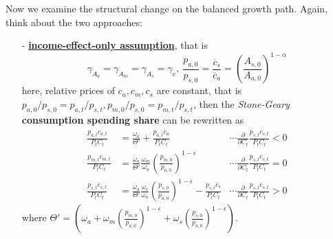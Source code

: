 \documentclass[10pt,landscape,a4paper]{article}
\let\bar\overline
\begin{document}
\begin{multicols*}{3}
\vspace{2pt}

\vspace{2pt}
Now we examine the structural change on the balanced growth path. Again, think about the two approaches:
\begin{itemize}
    \item[-] \underline{\textbf{income-effect-only assumption}}, that is $$\gamma_{A_a}=\gamma_{A_m}=\gamma_{A_s}=\gamma_c,\ \frac{p_{a,0}}{p_{s,0}}=\frac{\bar{c}_s}{\bar{c}_a}=\left(\frac{A_{s,0}}{A_{a,0}}\right)^{1-\alpha}$$
    here, relative prices of $c_a,c_m,c_s$ are constant, that is $p_{a,0}/p_{s,0}=p_{a,t}/p_{s,t},p_{m,0}/p_{s,0}=p_{m,t}/p_{s,t}$, then the \textit{Stone-Geary} \textbf{consumption spending share} can be rewritten as
    \begin{align*}
    \frac{p_{a,t}c_{a,t}}{P_tC_t}&=\frac{\omega_a}{\Theta'}+\frac{p_{a,t}\bar{c}_a}{P_tC_t}&\cdots \frac{\partial}{\partial C_t}\frac{p_{s,t}c_{s,t}}{P_tC_t}<0\\
    \frac{p_{m,t}c_{m,t}}{P_tC_t}&=\frac{\omega_a}{\Theta'}\frac{\omega_m}{\omega_a} \left(\frac{p_{m,0}}{p_{a,0}}\right)^{1-\epsilon}&\cdots \frac{\partial}{\partial C_t}\frac{p_{s,t}c_{s,t}}{P_tC_t}=0\\
    \frac{p_{s,t}c_{s,t}}{P_tC_t}&=\frac{\omega_a}{\Theta'}\frac{\omega_s}{\omega_a} \left(\frac{p_{s,0}}{p_{a,0}}\right)^{1-\epsilon}-\frac{p_{s,t}\bar{c}_s}{P_tC_t} &\cdots \frac{\partial}{\partial C_t}\frac{p_{s,t}c_{s,t}}{P_tC_t}>0
\end{align*}
where $\Theta' = \left( \omega_a+\omega_m\left(\frac{p_{m,0}}{p_{a,0}}\right)^{1-\epsilon} +\omega_s\left(\frac{p_{s,0}}{p_{a,0}}\right)^{1-\epsilon}\right)$.


\end{itemize}
\end{multicols*}
\end{document}
